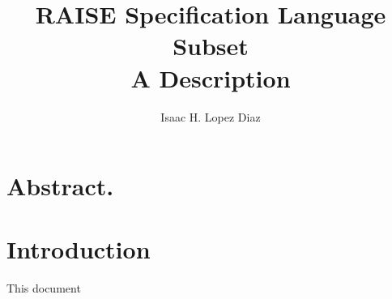 \documentclass{article}
\title{RAISE Specification Language Subset \\ A Description}
\author{Isaac H. Lopez Diaz}
\begin{document}
\maketitle
\section*{Abstract.}

\section{Introduction}
This document
\end{document}

